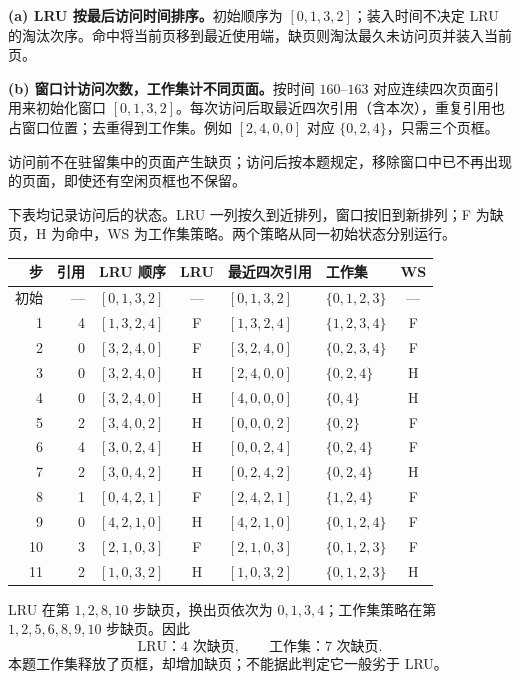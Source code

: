 \begin{checkedsolution}
\textbf{(a) LRU 按最后访问时间排序。}初始顺序为 $[0,1,3,2]$；装入时间不决定 LRU 的淘汰次序。命中将当前页移到最近使用端，缺页则淘汰最久未访问页并装入当前页。

\textbf{(b) 窗口计访问次数，工作集计不同页面。}按时间 $160$--$163$ 对应连续四次页面引用来初始化窗口 $[0,1,3,2]$。每次访问后取最近四次引用（含本次），重复引用也占窗口位置；去重得到工作集。例如 $[2,4,0,0]$ 对应 $\{0,2,4\}$，只需三个页框。

访问前不在驻留集中的页面产生缺页；访问后按本题规定，移除窗口中已不再出现的页面，即使还有空闲页框也不保留。

下表均记录访问后的状态。LRU 一列按久到近排列，窗口按旧到新排列；F 为缺页，H 为命中，WS 为工作集策略。两个策略从同一初始状态分别运行。

{\small
\begin{longtable}{@{}rrlcllc@{}}
\toprule
步 & 引用 & LRU 顺序 & LRU & 最近四次引用 & 工作集 & WS \\
\midrule
\endhead
\bottomrule
\endfoot
初始 & --- & $[0,1,3,2]$ & --- & $[0,1,3,2]$ & $\{0,1,2,3\}$ & --- \\
1 & 4 & $[1,3,2,4]$ & F & $[1,3,2,4]$ & $\{1,2,3,4\}$ & F \\
2 & 0 & $[3,2,4,0]$ & F & $[3,2,4,0]$ & $\{0,2,3,4\}$ & F \\
3 & 0 & $[3,2,4,0]$ & H & $[2,4,0,0]$ & $\{0,2,4\}$ & H \\
4 & 0 & $[3,2,4,0]$ & H & $[4,0,0,0]$ & $\{0,4\}$ & H \\
5 & 2 & $[3,4,0,2]$ & H & $[0,0,0,2]$ & $\{0,2\}$ & F \\
6 & 4 & $[3,0,2,4]$ & H & $[0,0,2,4]$ & $\{0,2,4\}$ & F \\
7 & 2 & $[3,0,4,2]$ & H & $[0,2,4,2]$ & $\{0,2,4\}$ & H \\
8 & 1 & $[0,4,2,1]$ & F & $[2,4,2,1]$ & $\{1,2,4\}$ & F \\
9 & 0 & $[4,2,1,0]$ & H & $[4,2,1,0]$ & $\{0,1,2,4\}$ & F \\
10 & 3 & $[2,1,0,3]$ & F & $[2,1,0,3]$ & $\{0,1,2,3\}$ & F \\
11 & 2 & $[1,0,3,2]$ & H & $[1,0,3,2]$ & $\{0,1,2,3\}$ & H \\
\end{longtable}
}

LRU 在第 $1,2,8,10$ 步缺页，换出页依次为 $0,1,3,4$；工作集策略在第 $1,2,5,6,8,9,10$ 步缺页。因此
\[
  \boxed{\text{LRU：}4\text{ 次缺页}},\qquad
  \boxed{\text{工作集：}7\text{ 次缺页}}.
\]
本题工作集释放了页框，却增加缺页；不能据此判定它一般劣于 LRU。
\end{checkedsolution}

